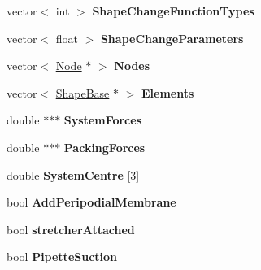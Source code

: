 \begin{DoxyCompactItemize}
\item 
\hypertarget{classSimulation_ac14e1aef8560da7de811fb3f29010dc0}{}vector$<$ int $>$ {\bfseries Shape\+Change\+Function\+Types}\label{classSimulation_ac14e1aef8560da7de811fb3f29010dc0}

\item 
\hypertarget{classSimulation_a92336ab44094ea95f48549c511815764}{}vector$<$ float $>$ {\bfseries Shape\+Change\+Parameters}\label{classSimulation_a92336ab44094ea95f48549c511815764}

\item 
\hypertarget{classSimulation_a51e3f02b266fd5156a1d78054f1dac37}{}vector$<$ \hyperlink{classNode}{Node} $\ast$ $>$ {\bfseries Nodes}\label{classSimulation_a51e3f02b266fd5156a1d78054f1dac37}

\item 
\hypertarget{classSimulation_a7731565e1391398dc2f6bd8880719c46}{}vector$<$ \hyperlink{classShapeBase}{Shape\+Base} $\ast$ $>$ {\bfseries Elements}\label{classSimulation_a7731565e1391398dc2f6bd8880719c46}

\item 
\hypertarget{classSimulation_a4b290b1bec21724b769c60033cd8f923}{}double $\ast$$\ast$$\ast$ {\bfseries System\+Forces}\label{classSimulation_a4b290b1bec21724b769c60033cd8f923}

\item 
\hypertarget{classSimulation_a46ca4dd54eb66252d513eac564ce20f5}{}double $\ast$$\ast$$\ast$ {\bfseries Packing\+Forces}\label{classSimulation_a46ca4dd54eb66252d513eac564ce20f5}

\item 
\hypertarget{classSimulation_a3229dca48a5d49bbcd641f74605341c0}{}double {\bfseries System\+Centre} \mbox{[}3\mbox{]}\label{classSimulation_a3229dca48a5d49bbcd641f74605341c0}

\item 
\hypertarget{classSimulation_ac95f47d33f702be850831edff2a6973e}{}bool {\bfseries Add\+Peripodial\+Membrane}\label{classSimulation_ac95f47d33f702be850831edff2a6973e}

\item 
\hypertarget{classSimulation_ab998930bbef90a5a59ba86079a44e7ae}{}bool {\bfseries stretcher\+Attached}\label{classSimulation_ab998930bbef90a5a59ba86079a44e7ae}

\item 
\hypertarget{classSimulation_a10cfa63b384b954f5ea34afca788f298}{}bool {\bfseries Pipette\+Suction}\label{classSimulation_a10cfa63b384b954f5ea34afca788f298}


\end{DoxyCompactItemize}
